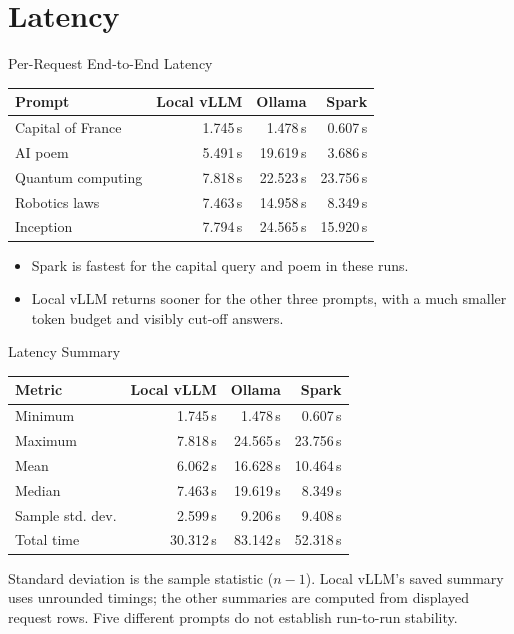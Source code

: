 \documentclass[aspectratio=169,12pt]{beamer}
\begin{document}
\section{Latency}
\begin{frame}{Per-Request End-to-End Latency}
\centering
\begin{tabular}{lrrr}
\toprule
Prompt & Local vLLM & Ollama & Spark \\
\midrule
Capital of France & 1.745\,s & 1.478\,s & 0.607\,s \\
AI poem & 5.491\,s & 19.619\,s & 3.686\,s \\
Quantum computing & 7.818\,s & 22.523\,s & 23.756\,s \\
Robotics laws & 7.463\,s & 14.958\,s & 8.349\,s \\
Inception & 7.794\,s & 24.565\,s & 15.920\,s \\

\bottomrule
\end{tabular}
\vfill
\begin{itemize}
\item Spark is fastest for the capital query and poem in these runs.
\item Local vLLM returns sooner for the other three prompts, with a much smaller token budget and visibly cut-off answers.
\end{itemize}
\end{frame}
\begin{frame}{Latency Summary}
\centering
\begin{tabular}{lrrr}
\toprule
Metric & Local vLLM & Ollama & Spark \\
\midrule
Minimum & 1.745\,s & 1.478\,s & 0.607\,s \\
Maximum & 7.818\,s & 24.565\,s & 23.756\,s \\
Mean & 6.062\,s & 16.628\,s & 10.464\,s \\
Median & 7.463\,s & 19.619\,s & 8.349\,s \\
Sample std. dev. & 2.599\,s & 9.206\,s & 9.408\,s \\
Total time & 30.312\,s & 83.142\,s & 52.318\,s \\

\bottomrule
\end{tabular}
\vfill
\small Standard deviation is the sample statistic ($n-1$). Local vLLM's saved summary uses unrounded timings; the other summaries are computed from displayed request rows. Five different prompts do not establish run-to-run stability.
\end{frame}
\end{document}
